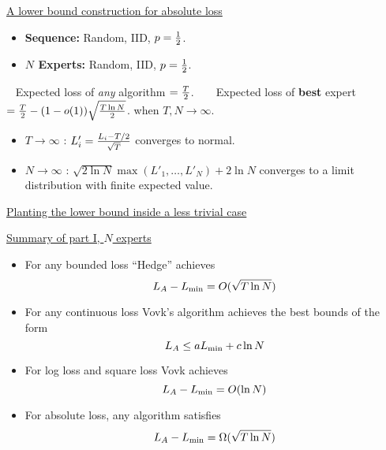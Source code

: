 \begin{flushleft}
\begin{LARGE}
\begin{center}
\underline{A lower bound construction for absolute loss}
\end{center}
\begin{itemize}
\item
{\bf Sequence:} Random, IID, $p={1 \over 2}$.
\item
{\bf $N$ Experts:} Random, IID, $p={1 \over 2}$.
\end{itemize}
~\newline
Expected loss of {\em any} algorithm $= {T \over 2}$.
~\newline
~\newline
Expected loss of {\bf best} expert 
$ = {T \over 2} - (1-o(1)) \sqrt{T \ln N \over 2}$.
when $T, N \to \infty$.
~\newline
\begin{itemize}
\item
$T \to \infty$ : $L'_i = {L_i-T/2 \over \sqrt{T}}$ converges to
normal.
\item
$N \to \infty$ : $\sqrt{2 \ln N}\max(L'_1,\ldots,L'_N)+2 \ln N$
converges to a limit distribution with finite expected value.
\end{itemize}
\pagebreak

\begin{center}
\underline{Planting the lower bound inside a less trivial case}
\end{center}

\pagebreak
\begin{center}
\underline{Summary of part I, $N$ experts}
\end{center}
\begin{itemize}
\item
For any bounded loss ``Hedge'' achieves
\[
L_A - L_{\min} = O(\sqrt{T \ln N})
\]
\item
For any continuous loss Vovk's algorithm achieves the best bounds of the form
\[
L_A \leq a L_{\min} + c \ln N
\]
\item
For log loss and square loss Vovk achieves
\[
L_A - L_{\min} = O(\ln N)
\]
\item
For absolute loss, any algorithm satisfies
\[
L_A - L_{\min} = \Omega(\sqrt{T \ln N})
\]
\end{itemize}


\end{LARGE}
\end{flushleft}
